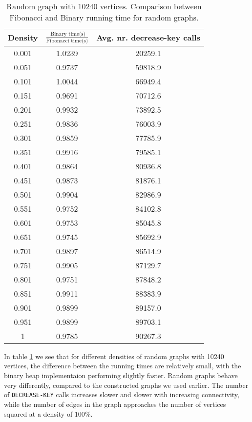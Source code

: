 \documentclass[a4paper,10pt]{article}
\begin{document}
\begin{table}
  \begin{center}
    \begin{tabular}{c|c|c}
      Density & $\frac{\text{ Binary time(s)}}{\text{Fibonacci time(s)}}$ & Avg. nr. decrease-key calls\\
      \hline
      0.001 & 1.0239 & 20259.1\\
      0.051	& 0.9737 & 59818.9\\
      0.101	& 1.0044 & 66949.4\\
      0.151	& 0.9691 & 70712.6\\
      0.201	& 0.9932 & 73892.5\\
      0.251	& 0.9836 & 76003.9\\
      0.301	& 0.9859 & 77785.9\\
      0.351	& 0.9916 & 79585.1\\
      0.401	& 0.9864 & 80936.8\\
      0.451	& 0.9873 & 81876.1\\
      0.501	& 0.9904 & 82986.9\\
      0.551	& 0.9752 & 84102.8\\
      0.601	& 0.9753 & 85045.8\\
      0.651	& 0.9745 & 85692.9\\
      0.701	& 0.9897 & 86514.9\\
      0.751	& 0.9905 & 87129.7\\
      0.801	& 0.9751 & 87848.2\\
      0.851	& 0.9911 & 88383.9\\
      0.901	& 0.9899 & 89157.0  \\
      0.951	& 0.9899 & 89703.1\\
      1		& 0.9785 & 90267.3
    \end{tabular}
    \caption{Random graph with 10240 vertices. Comparison between Fibonacci and Binary running time for random graphs.}
    \label{rand-graph-bib-div-bin}
  \end{center}
\end{table}
In table \ref{rand-graph-bib-div-bin} we see that for different densities of random graphs with 10240 vertices, the difference between the running times are relatively small, with the binary heap implementaion performing slightly faster. Random graphs behave very differently, compared to the constructed graphs we used earlier. The number of \texttt{DECREASE\--KEY} calls increases slower and slower with increasing connectivity, while the number of edges in the graph approaches the number of vertices squared at a density of 100\%.
\end{document}
